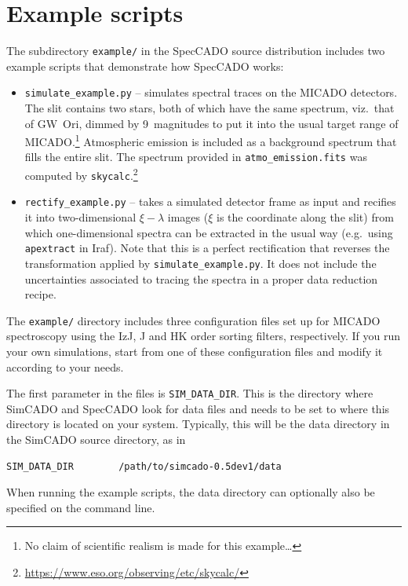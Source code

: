 \documentclass[a4paper,twoside,11pt]{article}
\begin{document}
\section{Example scripts}
\label{sec:examples}

The subdirectory \lstinline{example/} in the SpecCADO source
distribution includes two example scripts that demonstrate how
SpecCADO works:
\begin{itemize}
\item \lstinline{simulate_example.py} -- simulates spectral traces on
  the MICADO detectors. The slit contains two stars, both of which
  have the same spectrum, viz.~that of GW~Ori, dimmed by 9~magnitudes
  to put it into the usual target range of MICADO.\footnote{No claim
    of scientific realism is made for this example\dots} Atmospheric
  emission is included as a background spectrum that fills the entire
  slit. The spectrum provided in \lstinline{atmo_emission.fits} was
  computed by
  \lstinline{skycalc}.\footnote{\url{https://www.eso.org/observing/etc/skycalc/}}
\item \lstinline{rectify_example.py} -- takes a simulated detector
  frame as input and recifies it into two-dimensional $\xi-\lambda$
  images ($\xi$ is the coordinate along the slit) from which
  one-dimensional spectra can be extracted in the usual way
  (e.g.~using \lstinline{apextract} in Iraf). Note that this is a
  perfect rectification that reverses the transformation applied by
  \lstinline{simulate_example.py}. It does not include the
  uncertainties associated to tracing the spectra in a proper data
  reduction recipe.
\end{itemize}

The \lstinline{example/} directory includes three configuration files
set up for MICADO spectroscopy using the IzJ, J and HK order sorting
filters, respectively. If you run your own simulations, start from one
of these configuration files and modify it according to your needs.

The first parameter in the files is \lstinline{SIM_DATA_DIR}. This is
the directory where SimCADO and SpecCADO look for data files and needs
to be set to where this directory is located on your
system. Typically, this will be the data directory in the SimCADO
source directory, as in
\begin{lstlisting}[style=csh]
SIM_DATA_DIR        /path/to/simcado-0.5dev1/data
\end{lstlisting}
When running the example scripts, the data directory can optionally
also be specified on the command line.
\end{document}
